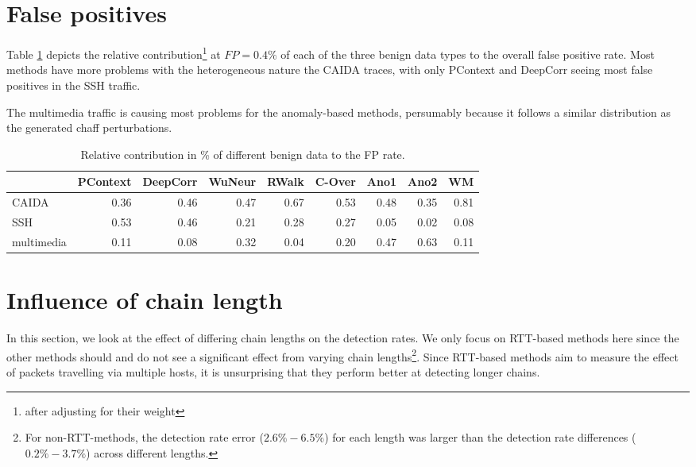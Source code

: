 \documentclass[runningheads,11pt]{llncs}\usepackage[]{graphicx}\usepackage[]{color}
\begin{document}

%



\appendix


\section{False positives}\label{Sec:FPana}

Table \ref{Tab:dfFP} depicts the relative contribution\footnote{after adjusting for their weight} at $FP=0.4\%$ of each of the three benign data types to the overall false positive rate. Most methods have more problems with the heterogeneous nature the CAIDA traces, with only PContext and DeepCorr seeing most false positives in the SSH traffic. 

The multimedia traffic is causing most problems for the anomaly-based methods, persumably because it follows a similar distribution as the generated chaff perturbations.
\begin{table}
\centering
\begin{tabular}{l|r|r|r|r|r|r|r|r}
  \hline
 & PContext & DeepCorr & WuNeur & RWalk & C-Over & Ano1 & Ano2 & WM \\ 
  \hline
CAIDA & 0.36 & 0.46 & 0.47 & 0.67 & 0.53 & 0.48 & 0.35 & 0.81 \\ 
  SSH & 0.53 & 0.46 & 0.21 & 0.28 & 0.27 & 0.05 & 0.02 & 0.08 \\ 
  multimedia & 0.11 & 0.08 & 0.32 & 0.04 & 0.20 & 0.47 & 0.63 & 0.11 \\ 
   \hline
\end{tabular}

\caption{Relative contribution in \% of different benign data to the FP rate.}\label{Tab:dfFP}
\end{table}




\section{Influence of chain length}\label{Sec:Chainl}

In this section, we look at the effect of differing chain lengths on the detection rates. We only focus on RTT-based methods here since the other methods should and do not see a significant effect from varying chain lengths\footnote{For non-RTT-methods, the detection rate error ($2.6\%-6.5\%$) for each length was larger than the detection rate differences ($0.2\%-3.7\%$) across different lengths.}. Since RTT-based methods aim to measure the effect of packets travelling via multiple hosts, it is unsurprising that they perform better at detecting longer chains. 
\end{document}
